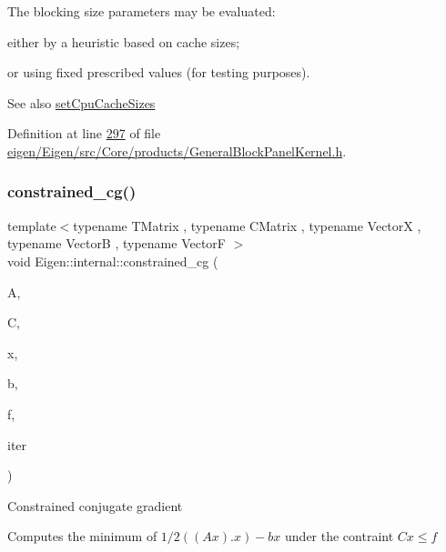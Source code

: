 The blocking size parameters may be evaluated\+:
\begin{DoxyItemize}
\item either by a heuristic based on cache sizes;
\item or using fixed prescribed values (for testing purposes).
\end{DoxyItemize}

\begin{DoxySeeAlso}{See also}
\hyperlink{namespace_eigen_ae64421554aa0a4bf9258bafe3170102b}{set\+Cpu\+Cache\+Sizes} 
\end{DoxySeeAlso}


Definition at line \hyperlink{eigen_2_eigen_2src_2_core_2products_2_general_block_panel_kernel_8h_source_l00297}{297} of file \hyperlink{eigen_2_eigen_2src_2_core_2products_2_general_block_panel_kernel_8h_source}{eigen/\+Eigen/src/\+Core/products/\+General\+Block\+Panel\+Kernel.\+h}.

\mbox{\label{namespace_eigen_1_1internal_a1c2f99746877fd46158af4a6b7dce2f9}} 
\subsubsection{\texorpdfstring{constrained\+\_\+cg()}{constrained\_cg()}}
{\footnotesize\ttfamily template$<$typename T\+Matrix , typename C\+Matrix , typename VectorX , typename VectorB , typename VectorF $>$ \\
void Eigen\+::internal\+::constrained\+\_\+cg (\begin{DoxyParamCaption}\item[{const T\+Matrix \&}]{A,  }\item[{const C\+Matrix \&}]{C,  }\item[{\hyperlink{group___core___module}{VectorX} \&}]{x,  }\item[{const VectorB \&}]{b,  }\item[{const VectorF \&}]{f,  }\item[{\hyperlink{class_eigen_1_1_iteration_controller}{Iteration\+Controller} \&}]{iter }\end{DoxyParamCaption})}

Constrained conjugate gradient

Computes the minimum of $ 1/2((Ax).x) - bx $ under the contraint $ Cx \le f $ 

